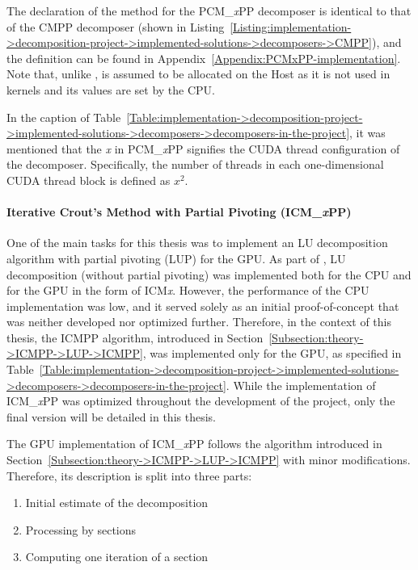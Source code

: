 The declaration of the  method for the PCM\_\textit{x}PP decomposer is identical to that of the CMPP decomposer (shown in Listing~\ref{Listing:implementation->decomposition-project->implemented-solutions->decomposers->CMPP}), and the definition can be found in Appendix~\ref{Appendix:PCMxPP-implementation}. Note that, unlike ,  is assumed to be allocated on the Host as it is not used in kernels and its values are set by the CPU.

In the caption of Table~\ref{Table:implementation->decomposition-project->implemented-solutions->decomposers->decomposers-in-the-project}, it was mentioned that the \textit{x} in PCM\_\textit{x}PP signifies the CUDA thread configuration of the decomposer. Specifically, the number of threads in each one-dimensional CUDA thread block is defined as $x^2$.

\paragraph{Iterative Crout's Method with Partial Pivoting (ICM\_\textit{x}PP)} One of the main tasks for this thesis was to implement an LU decomposition algorithm with partial pivoting (LUP) for the GPU. As part of  \cite{Cejka2022}, LU decomposition (without partial pivoting) was implemented both for the CPU and for the GPU in the form of ICM\textit{x}. However, the performance of the CPU implementation was low, and it served solely as an initial proof-of-concept that was neither developed nor optimized further. Therefore, in the context of this thesis, the ICMPP algorithm, introduced in Section~\ref{Subsection:theory->ICMPP->LUP->ICMPP}, was implemented only for the GPU, as specified in Table~\ref{Table:implementation->decomposition-project->implemented-solutions->decomposers->decomposers-in-the-project}. While the implementation of ICM\_\textit{x}PP was optimized throughout the development of the project, only the final version will be detailed in this thesis.

The GPU implementation of ICM\_\textit{x}PP follows the algorithm introduced in Section~\ref{Subsection:theory->ICMPP->LUP->ICMPP} with minor modifications. Therefore, its description is split into three parts:

\begin{enumerate}
	\item Initial estimate of the decomposition
	\item Processing by sections
	\item Computing one iteration of a section
\end{enumerate}

